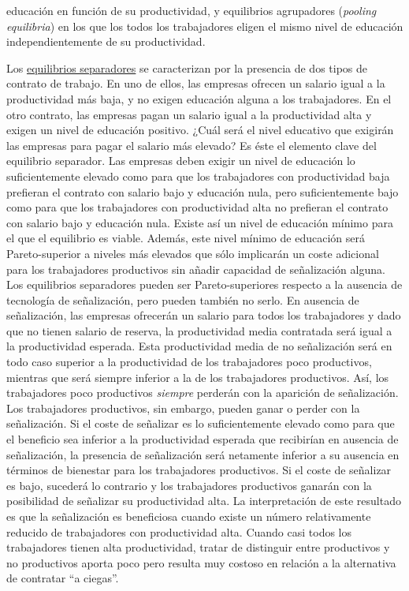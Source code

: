 \documentclass{nuevotema}
\begin{document}
educación en función de su productividad, y equilibrios agrupadores (\textit{pooling equilibria}) en los que los todos los trabajadores eligen el mismo nivel de educación independientemente de su productividad. 

Los \underline{equilibrios separadores} se caracterizan por la presencia de dos tipos de contrato de trabajo. En uno de ellos, las empresas ofrecen un salario igual a la productividad más baja, y no exigen educación alguna a los trabajadores. En el otro contrato, las empresas pagan un salario igual a la productividad alta y exigen un nivel de educación positivo. ¿Cuál será el nivel educativo que exigirán las empresas para pagar el salario más elevado? Es éste el elemento clave del equilibrio separador. Las empresas deben exigir un nivel de educación lo suficientemente elevado como para que los trabajadores con productividad baja prefieran el contrato con salario bajo y educación nula, pero suficientemente bajo como para que los trabajadores con productividad alta no prefieran el contrato con salario bajo y educación nula. Existe así un nivel de educación mínimo para el que el equilibrio es viable. Además, este nivel mínimo de educación será Pareto-superior a niveles más elevados que sólo implicarán un coste adicional para los trabajadores productivos sin añadir capacidad de señalización alguna. Los equilibrios separadores pueden ser Pareto-superiores respecto a la ausencia de tecnología de señalización, pero pueden también no serlo. En ausencia de señalización, las empresas ofrecerán un salario para todos los trabajadores y dado que no tienen salario de reserva, la productividad media contratada será igual a la productividad esperada. Esta productividad media de no señalización será en todo caso superior a la productividad de los trabajadores poco productivos, mientras que será siempre inferior a la de los trabajadores productivos. Así, los trabajadores poco productivos \textit{siempre} perderán con la aparición de señalización. Los trabajadores productivos, sin embargo, pueden ganar o perder con la señalización. Si el coste de señalizar es lo suficientemente elevado como para que el beneficio sea inferior a la productividad esperada que recibirían en ausencia de señalización, la presencia de señalización será netamente inferior a su ausencia en términos de bienestar para los trabajadores productivos. Si el coste de señalizar es bajo, sucederá lo contrario y los trabajadores productivos ganarán con la posibilidad de señalizar su productividad alta. La interpretación de este resultado es que la señalización es beneficiosa cuando existe un número relativamente reducido de trabajadores con productividad alta. Cuando casi todos los trabajadores tienen alta productividad, tratar de distinguir entre productivos y no productivos aporta poco pero resulta muy costoso en relación a la alternativa de contratar ``a ciegas''.
\end{document}
